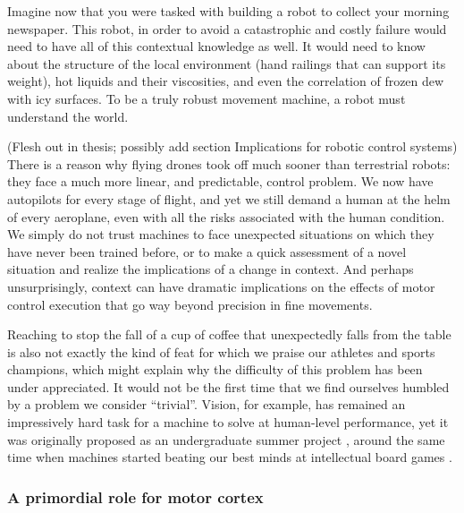 Imagine now that you were tasked with building a robot to collect your morning newspaper. This robot, in order to avoid a catastrophic and costly failure would need to have all of this contextual knowledge as well. It would need to know about the structure of the local environment (hand railings that can support its weight), hot liquids and their viscosities, and even the correlation of frozen dew with icy surfaces. To be a truly robust movement machine, a robot must understand the world.

(Flesh out in thesis; possibly add section Implications for robotic control systems)
There is a reason why flying drones took off much sooner than terrestrial robots: they face a much more linear, and predictable, control problem. We now have autopilots for every stage of flight, and yet we still demand a human at the helm of every aeroplane, even with all the risks associated with the human condition. We simply do not trust machines to face unexpected situations on which they have never been trained before, or to make a quick assessment of a novel situation and realize the implications of a change in context. And perhaps unsurprisingly, context can have dramatic implications on the effects of motor control execution that go way beyond precision in fine movements.

Reaching to stop the fall of a cup of coffee that unexpectedly falls from the table is also not exactly the kind of feat for which we praise our athletes and sports champions, which might explain why the difficulty of this problem has been under appreciated. It would not be the first time that we find ourselves humbled by a problem we consider ``trivial''. Vision, for example, has remained an impressively hard task for a machine to solve at human-level performance, yet it was originally proposed as an undergraduate summer project \cite{Papert1966}, around the same time when machines started beating our best minds at intellectual board games \cite{Samuel1959}.

\subsubsection*{A primordial role for motor cortex}


